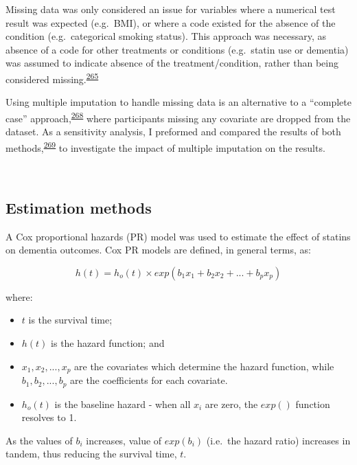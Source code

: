 \documentclass[a4paper, twoside]{templates/ociamthesis}
\providecommand{\tightlist}{%
  \setlength{\itemsep}{0pt}\setlength{\parskip}{0pt}}
\begin{document}
Missing data was only considered an issue for variables where a numerical test result was expected (e.g.~BMI), or where a code existed for the absence of the condition (e.g.~categorical smoking status). This approach was necessary, as absence of a code for other treatments or conditions (e.g.~statin use or dementia) was assumed to indicate absence of the treatment/condition, rather than being considered missing.\textsuperscript{\protect\hyperlink{ref-wells2013strategies}{265}}

Using multiple imputation to handle missing data is an alternative to a ``complete case'' approach,\textsuperscript{\protect\hyperlink{ref-pigott2001review}{268}} where participants missing any covariate are dropped from the dataset. As a sensitivity analysis, I preformed and compared the results of both methods,\textsuperscript{\protect\hyperlink{ref-hughes2019}{269}} to investigate the impact of multiple imputation on the results.

~

\hypertarget{estimation-methods}{%
\subsection{Estimation methods}\label{estimation-methods}}

A Cox proportional hazards (PR) model was used to estimate the effect of statins on dementia outcomes. Cox PR models are defined, in general terms, as:

\begin{equation}
  h(t) = h_o(t) \times exp(b_1x_1 + b_2x_2 + ... +b_px_p)
  \label{eq:cox-model}
\end{equation}

where:

\begin{itemize}
\tightlist
\item
  \(t\) is the survival time;
\item
  \(h(t)\) is the hazard function; and
\item
  \(x_1,x_2,...,x_p\) are the covariates which determine the hazard function, while \(b_1,b_2,...,b_p\) are the coefficients for each covariate.
\item
  \(h_o(t)\) is the baseline hazard - when all \(x_i\) are zero, the \(exp()\) function resolves to 1.
\end{itemize}

As the values of \(b_i\) increases, value of \(exp(b_i)\) (i.e.~the hazard ratio) increases in tandem, thus reducing the survival time, \(t\).
\end{document}
